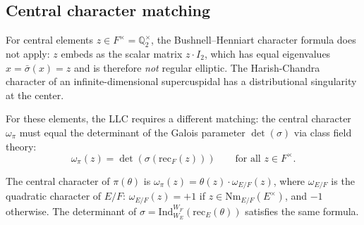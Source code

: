 \documentclass[11pt]{article}
\theoremstyle{plain}
\theoremstyle{definition}
\theoremstyle{remark}
\newcommand{\Q}{\mathbb{Q}}
\newcommand{\Ind}{\mathrm{Ind}}
\newcommand{\Nm}{\mathrm{Nm}}
\newcommand{\rec}{\mathrm{rec}}
\begin{document}
\subsection{Central character matching}\label{ssec:central}

For central elements $z \in F^\times = \Q_2^\times$, the
Bushnell--Henniart character formula does not apply: $z$ embeds
as the scalar matrix $z \cdot I_2$, which has equal eigenvalues
$x = \bar\sigma(x) = z$ and is therefore \emph{not} regular
elliptic.  The Harish-Chandra character of an
infinite-dimensional supercuspidal has a distributional singularity
at the center.

For these elements, the LLC requires a different matching:
the central character $\omega_\pi$ must equal the determinant
of the Galois parameter $\det(\sigma)$ via class field theory:
\[
  \omega_\pi(z) = \det(\sigma(\rec_F(z)))
  \qquad \text{for all } z \in F^\times.
\]

The central character of $\pi(\theta)$ is
$\omega_\pi(z) = \theta(z) \cdot \omega_{E/F}(z)$,
where $\omega_{E/F}$ is the quadratic character of $E/F$:
$\omega_{E/F}(z) = +1$ if $z \in \Nm_{E/F}(E^\times)$,
and $-1$ otherwise.  The determinant of
$\sigma = \Ind_{W_E}^{W_F}(\rec_E(\theta))$ satisfies the
same formula.
\end{document}
